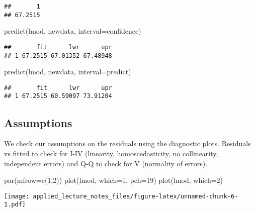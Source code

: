 \documentclass[
]{article}
\newenvironment{Shaded}{\begin{snugshade}}{\end{snugshade}}
\newcommand{\AttributeTok}[1]{\textcolor[rgb]{0.77,0.63,0.00}{#1}}
\newcommand{\DecValTok}[1]{\textcolor[rgb]{0.00,0.00,0.81}{#1}}
\newcommand{\FunctionTok}[1]{\textcolor[rgb]{0.00,0.00,0.00}{#1}}
\newcommand{\NormalTok}[1]{#1}
\newcommand{\StringTok}[1]{\textcolor[rgb]{0.31,0.60,0.02}{#1}}
\begin{document}
\begin{verbatim}
##       1 
## 67.2515
\end{verbatim}

\begin{Shaded}
\begin{Highlighting}[]
\FunctionTok{predict}\NormalTok{(lmod, newdata, }\AttributeTok{interval=}\StringTok{\textquotesingle{}confidence\textquotesingle{}}\NormalTok{)}
\end{Highlighting}
\end{Shaded}

\begin{verbatim}
##       fit      lwr      upr
## 1 67.2515 67.01352 67.48948
\end{verbatim}

\begin{Shaded}
\begin{Highlighting}[]
\FunctionTok{predict}\NormalTok{(lmod, newdata, }\AttributeTok{interval=}\StringTok{\textquotesingle{}predict\textquotesingle{}}\NormalTok{)}
\end{Highlighting}
\end{Shaded}

\begin{verbatim}
##       fit      lwr      upr
## 1 67.2515 60.59097 73.91204
\end{verbatim}

\hypertarget{assumptions}{%
\subsection{Assumptions}\label{assumptions}}

We check our assumptions on the residuals using the diagnostic plots.
Residuals vs fitted to check for I-IV (linearity, homoscedasticity, no
collinearity, independent errors) and Q-Q to check for V (normality of
errors).

\begin{Shaded}
\begin{Highlighting}[]
\FunctionTok{par}\NormalTok{(}\AttributeTok{mfrow=}\FunctionTok{c}\NormalTok{(}\DecValTok{1}\NormalTok{,}\DecValTok{2}\NormalTok{))}
\FunctionTok{plot}\NormalTok{(lmod, }\AttributeTok{which=}\DecValTok{1}\NormalTok{, }\AttributeTok{pch=}\DecValTok{19}\NormalTok{)}
\FunctionTok{plot}\NormalTok{(lmod, }\AttributeTok{which=}\DecValTok{2}\NormalTok{)}
\end{Highlighting}
\end{Shaded}

\texttt{[image: applied\_lecture\_notes\_files/figure-latex/unnamed-chunk-6-1.pdf]}
\end{document}
